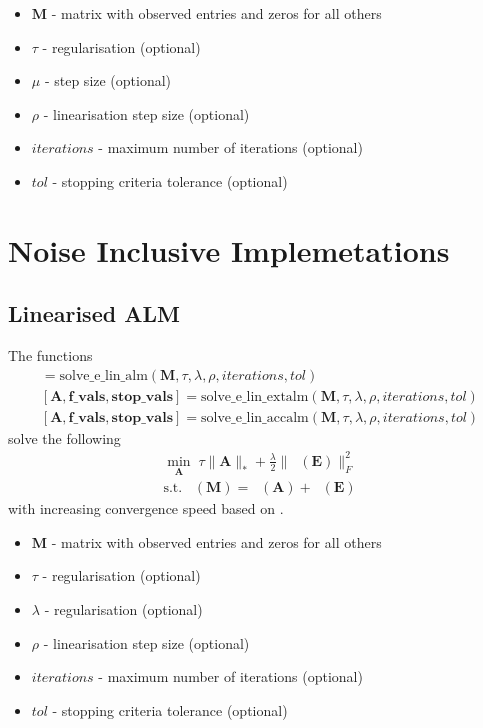 \documentclass{article}
\DeclareMathOperator*{\pro}{\mathcal P_{\Omega}}
\begin{document}
\begin{itemize}
\item $\mathbf M$ - matrix with observed entries and zeros for all others
\item $\tau$ - regularisation (optional)
\item $\mu$ - step size (optional)
\item $\rho$ - linearisation step size (optional)
\item $iterations$ - maximum number of iterations (optional)
\item $tol$ - stopping criteria tolerance (optional)
\end{itemize}

\newpage
\section{Noise Inclusive Implemetations}

\subsection{Linearised ALM}

The functions
\begin{align}
[ \mathbf A, \mathbf{f\_vals}, \mathbf{stop\_vals} ] = \text{solve\_e\_lin\_alm}( \mathbf M, \tau, \lambda, \rho, iterations, tol ) \\
[ \mathbf A, \mathbf{f\_vals}, \mathbf{stop\_vals} ] = \text{solve\_e\_lin\_extalm}( \mathbf M, \tau, \lambda, \rho, iterations, tol ) \\
[ \mathbf A, \mathbf{f\_vals}, \mathbf{stop\_vals} ] = \text{solve\_e\_lin\_accalm}( \mathbf M, \tau, \lambda, \rho, iterations, tol )
\end{align}
solve the following
\begin{align}
\min_{\mathbf A} \; \tau \| \mathbf A \|_* + \frac{\lambda}{2} \| \pro (\mathbf E) \|_F^2\\
\text{s.t.} \; \pro (\mathbf M) = \pro (\mathbf A) + \pro (\mathbf E) \nonumber 
\end{align}
with increasing convergence speed based on \cite{ji2009accelerated}.

\begin{itemize}
\item $\mathbf M$ - matrix with observed entries and zeros for all others
\item $\tau$ - regularisation (optional)
\item $\lambda$ - regularisation (optional)
\item $\rho$ - linearisation step size (optional)
\item $iterations$ - maximum number of iterations (optional)
\item $tol$ - stopping criteria tolerance (optional)
\end{itemize}

\newpage


\end{document}
